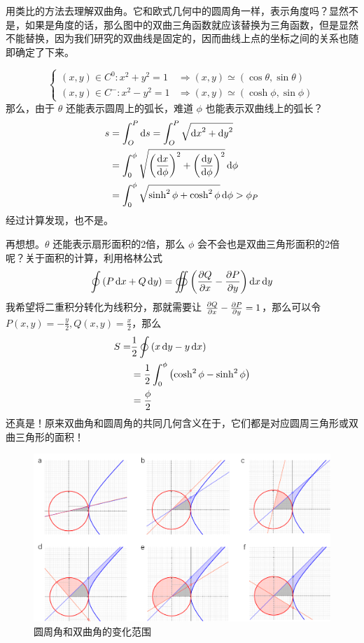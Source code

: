 \documentclass[12pt, a4paper, oneside]{ctexbook}
\begin{document}
用类比的方法去理解双曲角。它和欧式几何中的圆周角一样，表示角度吗？显然不是，如果是角度的话，那么图中的双曲三角函数就应该替换为三角函数，但是显然不能替换，因为我们研究的双曲线是固定的，因而曲线上点的坐标之间的关系也随即确定了下来。\par   
\begin{equation}
	\left\{
	\begin{aligned}
		(x,y)\in C^{0}:x^{2}+y^{2}=1&\Rightarrow(x,y)\simeq(\cos\theta,\sin\theta)\\
		(x,y)\in C^{-}:x^{2}-y^{2}=1&\Rightarrow(x,y)\simeq(\cosh\phi,\sin\phi)
	\end{aligned}
	\right.
\end{equation}
那么，由于 $\theta$ 还能表示圆周上的弧长，难道 $\phi$ 也能表示双曲线上的弧长？
\begin{equation}
	\begin{aligned}
		s&=\int_{O}^{P}\dd{s}=\int_{O}^{P}\sqrt{\dd{x}^{2}+\dd{y}^{2}}\\
		&=\int_{0}^{\phi}\sqrt{\qty(\dv{x}{\phi})^{2}+\qty(\dv{y}{\phi})^{2}}\dd{\phi}\\
		&=\int_{0}^{\phi}\sqrt{\sinh^{2}\phi+\cosh^{2}\phi}\dd{\phi}>\phi_{P}
	\end{aligned}
\end{equation}
经过计算发现，也不是。\par   
再想想。$\theta$ 还能表示扇形面积的2倍，那么 $\phi$ 会不会也是双曲三角形面积的2倍呢？关于面积的计算，利用格林公式
\begin{equation}
	\oint\qty(P\dd{x}+Q\dd{y})=\oiint\qty(\pdv{Q}{x}-\pdv{P}{y})\dd{x}\dd{y}
\end{equation}
我希望将二重积分转化为线积分，那就需要让 $\pdv{Q}{x}-\pdv{P}{y}=1$，那么可以令 $P(x,y)=-\frac{y}{2},Q(x,y)=\frac{x}{2}$，那么
\begin{equation}
	\begin{aligned}
		S=&\frac{1}{2}\oint\qty(x\dd{y}-y\dd{x})\\
		&=\frac{1}{2}\int_{0}^{\phi}\qty(\cosh^{2}\phi-\sinh^{2}\phi)\\
		&=\frac{\phi}{2}
	\end{aligned}
\end{equation}
还真是！原来双曲角和圆周角的共同几何含义在于，它们都是对应圆周三角形或双曲三角形的面积！
\begin{figure}[H]
	\centering
	\includegraphics[scale=0.5]{figures/circular-hyperbolic-angle.png}
	\caption{圆周角和双曲角的变化范围}
\end{figure}
\end{document}
